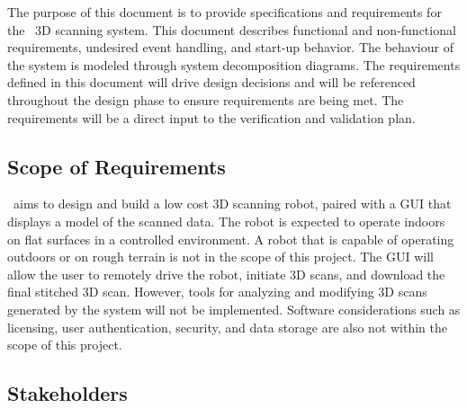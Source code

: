 \documentclass[12pt]{article}
\begin{document}
  The purpose of this document is to provide specifications and requirements for the \progname\ 3D scanning system. This document describes functional and non-functional requirements, undesired event handling, and start-up behavior. The behaviour of the system is modeled through system decomposition diagrams. The requirements defined in this document will drive design decisions and will be referenced throughout the design phase to ensure requirements are being met. The requirements will be a direct input to the verification and validation plan.

\subsection{Scope of Requirements} 
\label{sec_Scope}



\progname\ aims to design and build a low cost 3D scanning robot, paired with a GUI that displays a model of the scanned data.
The robot is expected to operate indoors on flat surfaces in a controlled environment.
A robot that is capable of operating outdoors or on rough terrain is not in the scope of this project.
The GUI will allow the user to remotely drive the robot, initiate 3D scans, and download the final stitched 3D scan.
However, tools for analyzing and modifying 3D scans generated by the system will not be implemented.
Software considerations such as licensing, user authentication, security, and data storage are also not within the scope of this project.

\subsection{Stakeholders}
\end{document}
